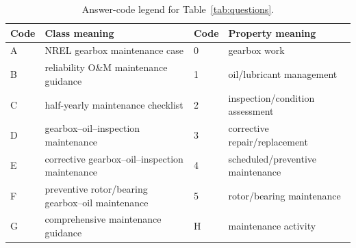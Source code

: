 \begin{table}[H]
\centering
\caption{Answer-code legend for Table~\ref{tab:questions}.}
\label{tab:codelegend}
\scriptsize
\renewcommand{\arraystretch}{0.85}
\begin{tabular}{L{0.08\textwidth}L{0.34\textwidth}L{0.08\textwidth}L{0.34\textwidth}}
\toprule
Code & Class meaning & Code & Property meaning\\
\midrule
A & NREL gearbox maintenance case & 0 & gearbox work\\
B & reliability O\&M maintenance guidance & 1 & oil/lubricant management\\
C & half-yearly maintenance checklist & 2 & inspection/condition assessment\\
D & gearbox--oil--inspection maintenance & 3 & corrective repair/replacement\\
E & corrective gearbox--oil--inspection maintenance & 4 & scheduled/preventive maintenance\\
F & preventive rotor/bearing gearbox--oil maintenance & 5 & rotor/bearing maintenance\\
G & comprehensive maintenance guidance & H & maintenance activity\\
\bottomrule
\end{tabular}
\end{table}

